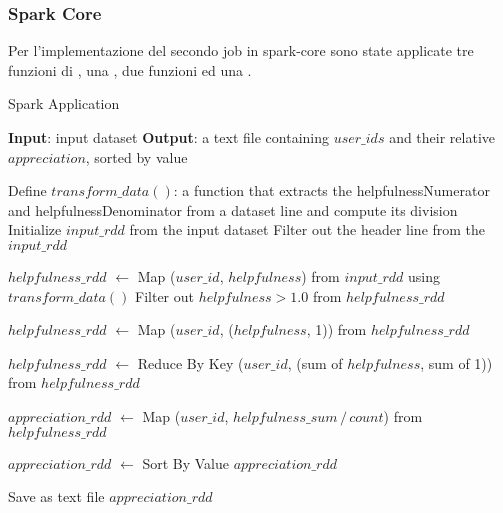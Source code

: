   
  \subsubsection{Spark Core}
  Per l'implementazione del secondo job in spark-core sono state applicate tre funzioni di , una , due funzioni  ed una .
  \begin{algorithm}
    \caption{Spark Application}
    \begin{algorithmic}[1]
        \STATE \textbf{Input}: input dataset
        \STATE \textbf{Output}: a text file containing $user\_ids$ and their relative $appreciation$, sorted by value
        
        \STATE Define $transform\_data()$: a function that extracts the helpfulnessNumerator and helpfulnessDenominator from a dataset line and compute its division
        \STATE Initialize $input\_rdd$ from the input dataset
        \STATE Filter out the header line from the $input\_rdd$

        \STATE $helpfulness\_rdd$ $\gets$ Map ($user\_id$, $helpfulness$) from $input\_rdd$ using $transform\_data()$
        \STATE Filter out $helpfulness > 1.0$ from $helpfulness\_rdd$

        \STATE $helpfulness\_rdd$ $\gets$ Map ($user\_id$, ($helpfulness$, 1)) from $helpfulness\_rdd$
        
        \STATE $helpfulness\_rdd$ $\gets$ Reduce By Key ($user\_id$, (sum of $helpfulness$,  sum of 1)) from $helpfulness\_rdd$
        
        \STATE $appreciation\_rdd$ $\gets$ Map ($user\_id$, $helpfulness\_sum\,/\, count$) from $helpfulness\_rdd$
        
        \STATE $appreciation\_rdd$ $\gets$ Sort By Value $appreciation\_rdd$

        \STATE Save as text file $appreciation\_rdd$
    \end{algorithmic}
    \end{algorithm}
    
  
